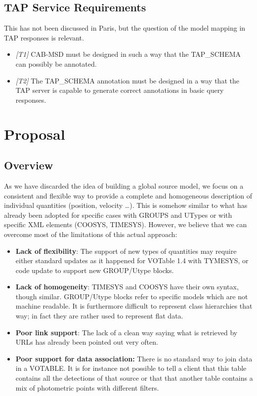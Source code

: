 \documentclass[11pt,a4paper]{ivoa}
\begin{document}
\subsection{TAP Service Requirements}
This has not been discussed in Paris, but the question of the model mapping in TAP responses is relevant.
\begin{itemize}
    \item \textit{[T1]} CAB-MSD must be designed in such a way that the TAP\_SCHEMA can possibly be annotated.
    \item \textit{[T2]} The TAP\_SCHEMA annotation must be designed in a way that the TAP server is capable to generate correct annotations in basic query responses.
\end{itemize}

\section{Proposal}
\subsection{Overview}
As we have discarded the idea of building a global source model, we focus on a consistent and flexible way to provide a complete and homogeneous description of individual quantities (position, velocity \dots). 
This is somehow similar to what has already been adopted for specific cases with GROUPS and UTypes or with specific XML elements (COOSYS, TIMESYS). However, we believe that we can overcome most of the limitations of this actual approach:
\begin{itemize}
\item \textbf{Lack of flexibility}: The support of new types of quantities may require either standard updates as it happened for VOTable 1.4 with TYMESYS, or code update to support new GROUP/Utype blocks.
\item \textbf{Lack of homogeneity}: TIMESYS and COOSYS have their own syntax, though similar.  GROUP/Utype blocks refer to specific models which are not machine readable. It is furthermore difficult to represent class hierarchies that way; in fact they are rather used to represent flat data.
\item \textbf{Poor link support}: The lack of a clean way saying what is retrieved by URLs has already been pointed out very often.
\item \textbf{Poor support for data association: }There is no standard way to join data in a VOTABLE. It is for instance not possible to tell a client that this table contains all the detections of that source or that that another table contains a mix of photometric points with different filters.
\end{itemize}
\end{document}

